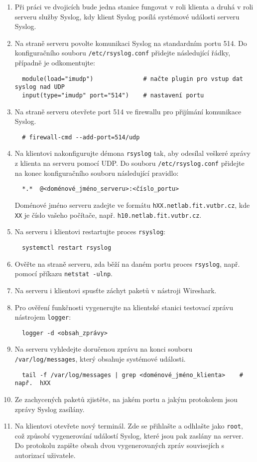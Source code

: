 \documentclass[a4paper,11pt]{article}
\begin{document}
\begin{enumerate}
  \item Při práci ve dvojicích bude jedna stanice fungovat v roli klienta a druhá v roli serveru služby Syslog, kdy klient Syslog posílá systémové události serveru Syslog.
  \item Na straně serveru povolte komunikaci Syslog na standardním portu 514. Do konfiguračního souboru {\tt /etc/rsyslog.conf} přidejte následující řádky, případně je odkomentujte:
    \vspace{-2mm}
\begin{verbatim}
  module(load="imudp")              # načte plugin pro vstup dat syslog nad UDP
  input(type="imudp" port="514")    # nastavení portu
\end{verbatim}
  \item Na straně serveru otevřete port 514 ve firewallu pro přijímání komunikace Syslog.
\begin{verbatim}
  # firewall-cmd --add-port=514/udp
\end{verbatim}
  \item  Na klientovi nakonfigurujte démona {\tt rsyslog} tak, aby odesílal veškeré zprávy z klienta na serveru pomocí UDP.
    Do souboru {\tt /etc/rsyslog.conf} přidejte na konec konfiguračního souboru následující pravidlo:
\begin{verbatim} 
  *.*  @<doménové_jméno_serveru>:<číslo_portu>
\end{verbatim}
    {\small Doménové jméno serveru zadejte ve formátu \texttt{hXX.netlab.fit.vutbr.cz}, kde \texttt{XX} je číslo vašeho počítače, např. \texttt{h10.netlab.fit.vutbr.cz}.}
  \item Na serveru i klientovi restartujte proces {\tt rsyslog}: 
\begin{verbatim}
  systemctl restart rsyslog
\end{verbatim} 
  \item Ověřte na straně serveru, zda běží na daném portu proces {\tt rsyslog}, např. pomocí příkazu \verb|netstat -ulnp|.
  \item Na serveru i klientovi spusťte záchyt paketů v nástroji Wireshark. 
  \item Pro ověření funkčnosti vygenerujte na klientské stanici testovací zprávu nástrojem {\tt logger}:
\begin{verbatim} 
  logger -d <obsah_zprávy>
\end{verbatim} 
  \item Na serveru vyhledejte doručenou zprávu na konci souboru {\tt /var/log/messages}, který obsahuje
        systémové události.
\begin{verbatim} 
  tail -f /var/log/messages | grep <doménové_jméno_klienta>    # např.  hXX
\end{verbatim} 
  \item Ze zachycených paketů zjistěte, na jakém portu a jakým protokolem jsou zprávy Syslog zasílány.
  \item Na klientovi otevřete nový terminál. Zde se přihlašte a odhlašte jako {\tt root}, což způsobí vygenerování událostí Syslog, které jsou pak zaslány na server. Do protokolu zapište obsah dvou vygenerovaných zpráv souvisejích s autorizací uživatele.
\end{enumerate}
\end{document}
